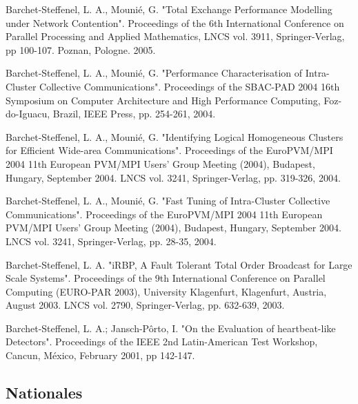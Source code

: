 \documentclass[final,twoside]{hdr} %
\begin{document}
Barchet-Steffenel, L. A., Mounié, G. "Total Exchange Performance Modelling under Network Contention". Proceedings of the 6th International Conference on Parallel Processing and Applied Mathematics, LNCS vol. 3911, Springer-Verlag, pp 100-107. Poznan, Pologne. 2005. 

Barchet-Steffenel, L. A., Mounié, G. "Performance Characterisation of Intra-Cluster Collective Communications". Proceedings of the SBAC-PAD 2004 16th Symposium on Computer Architecture and High Performance Computing, Foz-do-Iguacu, Brazil, IEEE Press, pp. 254-261, 2004. 

Barchet-Steffenel, L. A., Mounié, G. "Identifying Logical Homogeneous Clusters for Efficient Wide-area Communications". Proceedings of the EuroPVM/MPI 2004 11th European PVM/MPI Users' Group Meeting (2004), Budapest, Hungary, September 2004. LNCS vol. 3241, Springer-Verlag, pp. 319-326, 2004. 

Barchet-Steffenel, L. A., Mounié, G. "Fast Tuning of Intra-Cluster Collective Communications". Proceedings of the EuroPVM/MPI 2004 11th European PVM/MPI Users' Group Meeting (2004), Budapest, Hungary, September 2004. LNCS vol. 3241, Springer-Verlag, pp. 28-35, 2004. 

Barchet-Steffenel, L. A. "iRBP, A Fault Tolerant Total Order Broadcast for Large Scale Systems". Proceedings of the 9th International Conference on Parallel Computing (EURO-PAR 2003), University Klagenfurt, Klagenfurt, Austria, August 2003. LNCS vol. 2790, Springer-Verlag, pp. 632-639, 2003. 

Barchet-Steffenel, L. A.; Jansch-Pôrto, I. "On the Evaluation of heartbeat-like Detectors". Proceedings of the IEEE 2nd Latin-American Test Workshop, Cancun, México, February 2001, pp 142-147. 

%
%

\subsection*{Nationales}
\end{document}

